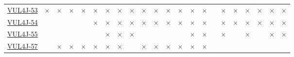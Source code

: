 \begin{table}[!htbp]
{\begin{tabular}{|l|lll|ll|ll||lll|ll|ll||lll|ll|ll|}
		\href{https://github.com/jenkinsci/jenkins/commit/e5046911c57e60a1d6d8aca9b21bd9093b0f3763}{VUL4J-53} & \cellcolor{red}$\times$ & \cellcolor{red}$\times$ & \cellcolor{red}$\times$ & \cellcolor{red}$\times$ & \cellcolor{red}$\times$ & \cellcolor{red}$\times$ & \cellcolor{red}$\times$  & \cellcolor{red}$\times$ & \cellcolor{red}$\times$ & \cellcolor{red}$\times$ & \cellcolor{red}$\times$ & \cellcolor{red}$\times$ & \cellcolor{red}$\times$ & \cellcolor{red}$\times$     & \cellcolor{green}\checkmark & \cellcolor{red}$\times$ & \cellcolor{red}$\times$ & \cellcolor{red}$\times$ & \cellcolor{red}$\times$ & \cellcolor{red}$\times$ & \cellcolor{red}$\times$\\ 
		\href{https://github.com/jenkinsci/jenkins/commit/701ea95a52afe53bee28f76a3f96eb0e578852e9}{VUL4J-54} & \cellcolor{green}\checkmark & \cellcolor{yellow}\halfcheckmark & \cellcolor{green}\checkmark &
		\cellcolor{yellow}\halfcheckmark & \cellcolor{red}$\times$ & \cellcolor{red}$\times$ & \cellcolor{red}$\times$  & \cellcolor{red}$\times$ & \cellcolor{red}$\times$ & \cellcolor{red}$\times$ & \cellcolor{red}$\times$ & \cellcolor{red}$\times$ & \cellcolor{red}$\times$ & \cellcolor{red}$\times$     & \cellcolor{green}\checkmark & \cellcolor{red}$\times$ & \cellcolor{red}$\times$ & \cellcolor{red}$\times$ & \cellcolor{red}$\times$ & \cellcolor{red}$\times$ & \cellcolor{red}$\times$\\ 
		\href{https://github.com/jenkinsci/jenkins/commit/73afa0ca786a87f05b5433e2e38f863826fcad17}{VUL4J-55} & \cellcolor{green}\checkmark & \cellcolor{yellow}\halfcheckmark & \cellcolor{green}\checkmark & 
		\cellcolor{yellow}\halfcheckmark & \cellcolor{green}\checkmark & \cellcolor{red}$\times$ & \cellcolor{red}$\times$  & \cellcolor{red}$\times$ & \cellcolor{yellow}\halfcheckmark & \cellcolor{green}\checkmark & \cellcolor{green}\checkmark & \cellcolor{green}\checkmark & \cellcolor{red}$\times$ & \cellcolor{red}$\times$     & \cellcolor{green}\checkmark & \cellcolor{red}$\times$ & \cellcolor{green}\checkmark & \cellcolor{red}$\times$ & \cellcolor{green}\checkmark & \cellcolor{red}$\times$ & \cellcolor{red}$\times$\\ 
		\href{https://github.com/jenkinsci/pipeline-build-step-plugin/commit/3dfefdec1f7b2a4ee0ef8902afdea720b1572cb3}{VUL4J-57} & \cellcolor{green}\checkmark & \cellcolor{red}$\times$ & \cellcolor{red}$\times$ & \cellcolor{red}$\times$ & \cellcolor{red}$\times$ & \cellcolor{red}$\times$ & \cellcolor{red}$\times$  & \cellcolor{green}\checkmark & \cellcolor{red}$\times$ & \cellcolor{red}$\times$ & \cellcolor{red}$\times$ & \cellcolor{red}$\times$ & \cellcolor{red}$\times$ & \cellcolor{red}$\times$     & \cellcolor{green}\checkmark & \cellcolor{yellow}\halfcheckmark & \cellcolor{green}\checkmark &

\end{tabular}}
\end{table}
